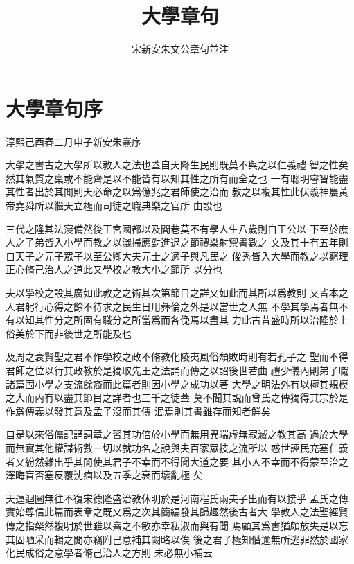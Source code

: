 \documentclass{zhvt-classic}
\title{大學章句}[大~學~章~句]
\author{宋新安朱文公章句並注}
\begin{document}
\maketitle

\clearpage

\gridall
\tableofcontents

\chapter*[序]{大學章句序}

\hfill 淳熙己酉春二月申子新安朱熹序

大學之書古之大學所以教人之法也蓋自天降生民則既莫不與之以仁義禮
智之性矣然其氣質之稟或不能齊是以不能皆有以知其性之所有而全之也
一有聰明睿智能盡其性者出於其閒則天必命之以爲億兆之君師使之治而
教之以複其性此伏羲神農黃帝堯舜所以繼天立極而司徒之職典樂之官所
由設也

三代之隆其法寖備然後王宮國都以及閭巷莫不有學人生八歲則自王公以
下至於庶人之子弟皆入小學而教之以灑掃應對進退之節禮樂射禦書數之
文及其十有五年則自天子之元子眾子以至公卿大夫元士之適子與凡民之
俊秀皆入大學而教之以窮理正心脩己治人之道此又學校之教大小之節所
以分也

夫以學校之設其廣如此教之之術其次第節目之詳又如此而其所以爲教則
又皆本之人君躬行心得之餘不待求之民生日用彝倫之外是以當世之人無
不學其學焉者無不有以知其性分之所固有職分之所當爲而各俛焉以盡其
力此古昔盛時所以治隆於上俗美於下而非後世之所能及也

及周之衰賢聖之君不作學校之政不脩教化陵夷風俗頹敗時則有若孔子之
聖而不得君師之位以行其政教於是獨取先王之法誦而傳之以詔後世若曲
禮少儀內則弟子職諸篇固小學之支流餘裔而此篇者則因小學之成功以著
大學之明法外有以極其規模之大而內有以盡其節目之詳者也三千之徒蓋
莫不聞其說而曾氏之傳獨得其宗於是作爲傳義以發其意及孟子沒而其傳
泯焉則其書雖存而知者鮮矣

自是以來俗儒記誦詞章之習其功倍於小學而無用異端虛無寂滅之教其高
過於大學而無實其他權謀術數一切以就功名之說與夫百家眾技之流所以
惑世誣民充塞仁義者又紛然雜出乎其閒使其君子不幸而不得聞大道之要
其小人不幸而不得蒙至治之澤晦盲否塞反覆沈痼以及五季之衰而壞亂極
矣

天運迴圈無往不復宋德隆盛治教休明於是河南程氏兩夫子出而有以接乎
孟氏之傳實始尊信此篇而表章之既又爲之次其簡編發其歸趣然後古者大
學教人之法聖經賢傳之指粲然複明於世雖以熹之不敏亦幸私淑而與有聞
焉顧其爲書猶頗放失是以忘其固陋采而輯之閒亦竊附己意補其闕略以俟
後之君子極知僭逾無所逃罪然於國家化民成俗之意學者脩己治人之方則
未必無小補云
\end{document}
